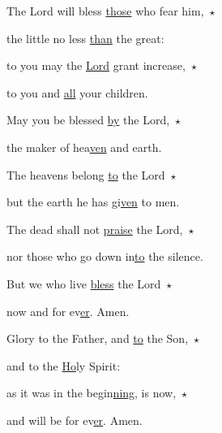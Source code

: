 \noindent The Lord will bless \uline{those} who fear him,~$\star$~

the little no less \uline{than} the great:

\noindent to you may the \uline{Lord} grant increase,~$\star$~

to you and \uline{all} your children.



\noindent May you be blessed \uline{by} the Lord,~$\star$~

the maker of hea\uline{ven} and earth.

\noindent The heavens belong \uline{to} the Lord~$\star$~

but the earth he has gi\uline{ven} to men.



\noindent The dead shall not \uline{praise} the Lord,~$\star$~

nor those who go down in\uline{to} the silence.

\noindent But we who live \uline{bless} the Lord~$\star$~

now and for ev\uline{er}. Amen.



\noindent Glory to the Father, and \uline{to} the Son,~$\star$~

and to the \uline{Ho}ly Spirit:

\noindent as it was in the begin\uline{ning}, is now,~$\star$~

and will be for ev\uline{er}. Amen.
